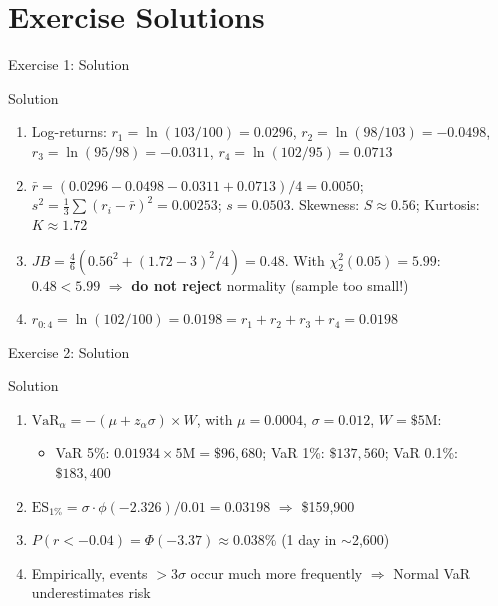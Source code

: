 \documentclass[9pt, aspectratio=169, t]{beamer}
\theoremstyle{definition}
\begin{document}
\section*{Exercise Solutions}

\begin{frame}{Exercise 1: Solution}
\begin{block}{Solution}
\begin{enumerate}
\item Log-returns: $r_1 = \ln(103/100) = 0.0296$, $r_2 = \ln(98/103) = -0.0498$, $r_3 = \ln(95/98) = -0.0311$, $r_4 = \ln(102/95) = 0.0713$
\item $\bar{r} = (0.0296 - 0.0498 - 0.0311 + 0.0713)/4 = 0.0050$; \;$s^2 = \frac{1}{3}\sum(r_i - \bar{r})^2 = 0.00253$; \;$s = 0.0503$. Skewness: $S \approx 0.56$; \;Kurtosis: $K \approx 1.72$
\item $JB = \frac{4}{6}(0.56^2 + (1.72-3)^2/4) = 0.48$. With $\chi^2_2(0.05) = 5.99$: $0.48 < 5.99$ $\Rightarrow$ \textbf{do not reject} normality (sample too small!)
\item $r_{0:4} = \ln(102/100) = 0.0198 = r_1 + r_2 + r_3 + r_4 = 0.0198$ \checkmark
\end{enumerate}
\end{block}
\end{frame}

\begin{frame}{Exercise 2: Solution}
\begin{block}{Solution}
\begin{enumerate}
\item $\text{VaR}_\alpha = -(\mu + z_\alpha\sigma) \times W$, with $\mu = 0.0004$, $\sigma = 0.012$, $W = \$5$M:
\begin{itemize}
\item VaR 5\%: $0.01934 \times 5\text{M} = \$96,680$; \; VaR 1\%: $\$137,560$; \; VaR 0.1\%: $\$183,400$
\end{itemize}
\item $\text{ES}_{1\%} = \sigma \cdot \phi(-2.326)/0.01 = 0.03198$ $\Rightarrow$ \$159,900
\item $P(r < -0.04) = \Phi(-3.37) \approx 0.038\%$ (1 day in $\sim$2,600)
\item Empirically, events $> 3\sigma$ occur much more frequently $\Rightarrow$ Normal VaR underestimates risk
\end{enumerate}
\end{block}
\end{frame}
\end{document}
